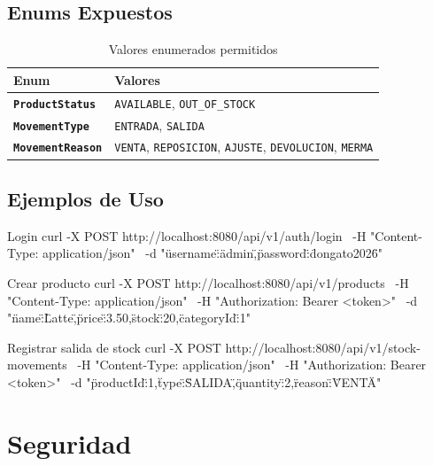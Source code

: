 \documentclass[11pt,oneside]{report}
\begin{document}
\section{Enums Expuestos}

\begin{table}[h!]
\centering
\caption{Valores enumerados permitidos}
\begin{tabularx}{\textwidth}{>{\bfseries}p{4cm} X}
\toprule
Enum & Valores \\
\midrule
\texttt{ProductStatus} & \texttt{AVAILABLE}, \texttt{OUT\_OF\_STOCK}\\
\texttt{MovementType} & \texttt{ENTRADA}, \texttt{SALIDA}\\
\texttt{MovementReason} & \texttt{VENTA}, \texttt{REPOSICION}, \texttt{AJUSTE}, \texttt{DEVOLUCION}, \texttt{MERMA}\\
\bottomrule
\end{tabularx}
\end{table}

\section{Ejemplos de Uso}

\begin{codewindow}[language=Text]{Login}
curl -X POST http://localhost:8080/api/v1/auth/login \
  -H "Content-Type: application/json" \
  -d "{\"username\":\"admin\",\"password\":\"dongato2026\"}"
\end{codewindow}

\begin{codewindow}[language=Text]{Crear producto}
curl -X POST http://localhost:8080/api/v1/products \
  -H "Content-Type: application/json" \
  -H "Authorization: Bearer <token>" \
  -d "{\"name\":\"Latte\",\"price\":3.50,\"stock\":20,\"categoryId\":1}"
\end{codewindow}

\begin{codewindow}[language=Text]{Registrar salida de stock}
curl -X POST http://localhost:8080/api/v1/stock-movements \
  -H "Content-Type: application/json" \
  -H "Authorization: Bearer <token>" \
  -d "{\"productId\":1,\"type\":\"SALIDA\",\"quantity\":2,\"reason\":\"VENTA\"}"
\end{codewindow}

\chapter{Seguridad}
\end{document}
